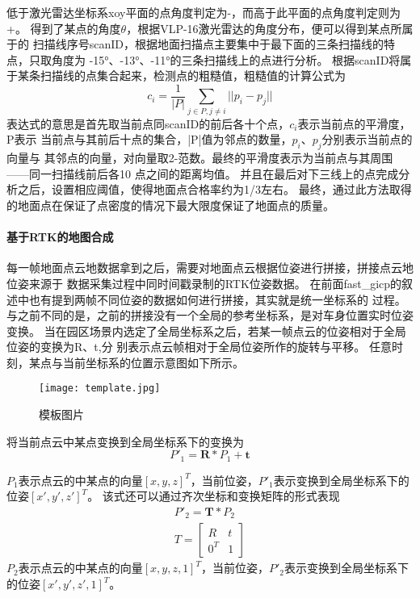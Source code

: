低于激光雷达坐标系xoy平面的点角度判定为-，而高于此平面的点角度判定则为+。
得到了某点的角度$\theta$，根据VLP-16激光雷达的角度分布，便可以得到某点所属于的
扫描线序号scanID，根据地面扫描点主要集中于最下面的三条扫描线的特点，只取角度为
-15°、-13°、-11°的三条扫描线上的点进行分析。
根据scanID将属于某条扫描线的点集合起来，检测点的粗糙值，粗糙值的计算公式为
\begin{equation}
    c_i=\frac{1}{|P|}\sum_{j\in P, j \ne i }||p_i-p_j|| 
\end{equation}
表达式的意思是首先取当前点同scanID的前后各十个点，$c_i$表示当前点的平滑度，P表示
当前点与其前后十点的集合，|P|值为邻点的数量，$p_i$、$p_j$分别表示当前点的向量与
其邻点的向量，对向量取2-范数。最终的平滑度表示为当前点与其周围——同一扫描线前后各10
点之间的距离均值。
并且在最后对下三线上的点完成分析之后，设置相应阈值，使得地面点合格率约为1/3左右。
最终，通过此方法取得的地面点在保证了点密度的情况下最大限度保证了地面点的质量。

\paragraph{基于RTK的地图合成}
每一帧地面点云地数据拿到之后，需要对地面点云根据位姿进行拼接，拼接点云地位姿来源于
数据采集过程中同时间戳录制的RTK位姿数据。
在前面fast\_gicp的叙述中也有提到两帧不同位姿的数据如何进行拼接，其实就是统一坐标系的
过程。与之前不同的是，之前的拼接没有一个全局的参考坐标系，是对车身位置实时位姿变换。
当在园区场景内选定了全局坐标系之后，若某一帧点云的位姿相对于全局位姿的变换为R、t,分
别表示点云帧相对于全局位姿所作的旋转与平移。
任意时刻，某点与当前坐标系的位置示意图如下所示。
\begin{figure}[ht]
    \centering
    \texttt{[image: template.jpg]}
    \caption{模板图片}
\end{figure}
将当前点云中某点变换到全局坐标系下的变换为
\begin{equation}
    P'_1 = \symbf{R} * P_1 + \symbf{t}
\end{equation}


$P_1$表示点云的中某点的向量$[x,y,z]^T$，当前位姿，$P'_1$表示变换到全局坐标系下的位姿$[x',y',z']^T$。
该式还可以通过齐次坐标和变换矩阵的形式表现
\begin{equation}
    \begin{aligned}
    P'_2 = \symbf{T} * P_2 \\
    T=\begin{bmatrix}
        R& t\\
        0^T&1
      \end{bmatrix}
    \end{aligned}
\end{equation}
$P_2$表示点云的中某点的向量$[x,y,z,1]^T$，当前位姿，$P'_2$表示变换到全局坐标系下的位姿$[x',y',z',1]^T$。

